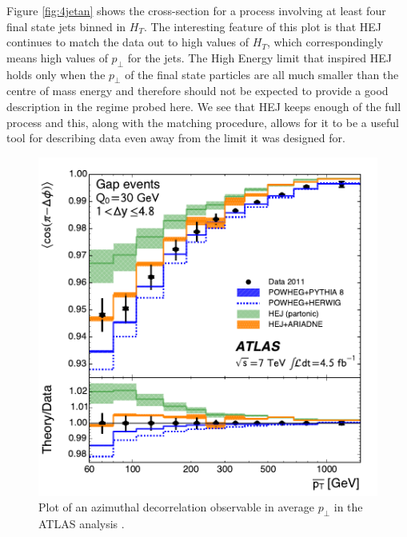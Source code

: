 Figure \ref{fig:4jetan} shows the cross-section for a process involving at least four final state jets binned in $H_T$. The interesting feature of this plot is that HEJ continues to match the data out to high values of $H_T$, which correspondingly means high values of $p_\perp$ for the jets. The High Energy limit that inspired HEJ holds only when the $p_\perp$ of the final state particles are all much smaller than the centre of mass energy and therefore should not be expected to provide a good description in the regime probed here. We see that HEJ keeps enough of the full process and this, along with the matching procedure, allows for it to be a useful tool for describing data even away from the limit it was designed for. 



\begin{figure}[t]
\centering
\includegraphics[scale=0.8]{Images/hej_powheg_agree.pdf} 
\caption{Plot of an azimuthal decorrelation observable in average $p_\perp$ in the ATLAS analysis \cite{Aad2014}.}
\label{fig:vetoptbar}
\end{figure}

